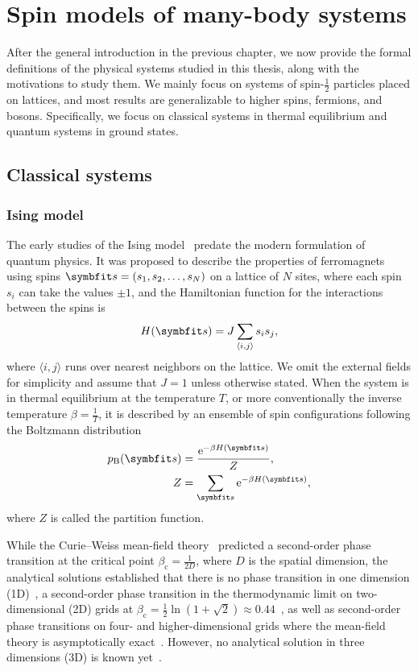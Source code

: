\chapter{Spin models of many-body systems}
\label{ch:systems}

After the general introduction in the previous chapter, we now provide the formal definitions of the physical systems studied in this thesis, along with the motivations to study them. We mainly focus on systems of spin-$\frac{1}{2}$ particles placed on lattices, and most results are generalizable to higher spins, fermions, and bosons. Specifically, we focus on classical systems in thermal equilibrium and quantum systems in ground states.

\section{Classical systems}
\label{sec:cl-sys}

\subsection{Ising model}
\label{sec:cl-ising}

The early studies of the Ising model~\cite{ising1925contribution, niss2008history} predate the modern formulation of quantum physics. It was proposed to describe the properties of ferromagnets using spins $\vs = (s_1, s_2, \ldots, s_N)$ on a lattice of $N$ sites, where each spin $s_i$ can take the values $\pm 1$, and the Hamiltonian function for the interactions between the spins is
\begin{equation}
H(\vs) = J \sum_{\langle i, j \rangle} s_i s_j,
\label{eq:cl-ising}
\end{equation}
where $\langle i, j \rangle$ runs over nearest neighbors on the lattice. We omit the external fields for simplicity and assume that $J = 1$ unless otherwise stated. When the system is in thermal equilibrium at the temperature $T$, or more conventionally the inverse temperature $\beta = \frac{1}{T}$, it is described by an ensemble of spin configurations following the Boltzmann distribution
\begin{align}
p_\text{B}(\vs) &= \frac{\rme^{-\beta H(\vs)}}{Z}, \label{eq:boltzmann} \\
Z &= \sum_\vs \rme^{-\beta H(\vs)},
\end{align}
where $Z$ is called the partition function.

While the Curie--Weiss mean-field theory~\cite{weiss1907hypothese} predicted a second-order phase transition at the critical point $\beta_\text{c} = \frac{1}{2 D}$, where $D$ is the spatial dimension, the analytical solutions established that there is no phase transition in one dimension (1D)~\cite{ising1925contribution}, a second-order phase transition in the thermodynamic limit on two-dimensional (2D) grids at $\beta_\text{c} = \frac{1}{2} \ln(1 + \sqrt{2}) \approx 0.44$~\cite{onsager1944crystal}, as well as second-order phase transitions on four- and higher-dimensional grids where the mean-field theory is asymptotically exact~\cite{als1977mean}. However, no analytical solution in three dimensions (3D) is known yet~\cite{viswanathan2022does}.

